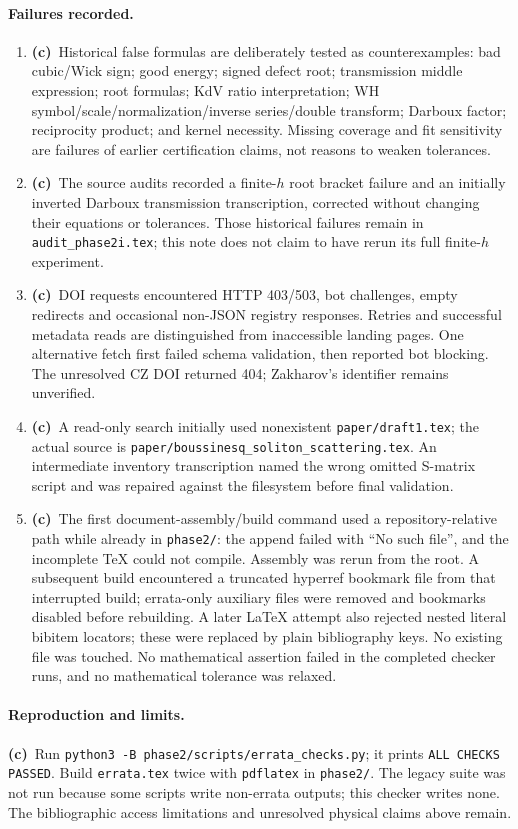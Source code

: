 \documentclass[11pt,a4paper]{article}
\newcommand{\C}{\textbf{(c)}\ }
\newcommand{\file}[1]{\nolinkurl{#1}}
\begin{document}
\paragraph{Failures recorded.}
\begin{enumerate}[leftmargin=*]
\item \C Historical false formulas are deliberately tested as
counterexamples: bad cubic/Wick sign; good energy; signed defect root;
transmission middle expression; root formulas; KdV ratio interpretation;
WH symbol/scale/normalization/inverse series/double transform; Darboux factor;
reciprocity product; and kernel necessity. Missing coverage and fit sensitivity
are failures of earlier certification claims, not reasons to weaken tolerances.
\item \C The source audits recorded a finite-$h$ root bracket failure and
an initially inverted Darboux transmission transcription, corrected without
changing their equations or tolerances. Those historical failures remain in
\file{audit_phase2i.tex}; this note does not claim to have rerun its full
finite-$h$ experiment.
\item \C DOI requests encountered HTTP 403/503, bot challenges, empty
redirects and occasional non-JSON registry responses. Retries and successful
metadata reads are distinguished from inaccessible landing pages. One
alternative fetch first failed schema validation, then reported bot blocking.
The unresolved CZ DOI returned 404; Zakharov's identifier remains unverified.
\item \C A read-only search initially used nonexistent
\file{paper/draft1.tex}; the actual source is
\file{paper/boussinesq_soliton_scattering.tex}. An intermediate inventory
transcription named the wrong omitted S-matrix script and was repaired
against the filesystem before final validation.
\item \C The first document-assembly/build command used a repository-relative
path while already in \file{phase2/}: the append failed with ``No such file'',
and the incomplete TeX could not compile. Assembly was rerun from the root.
A subsequent build encountered a truncated hyperref bookmark file from that
interrupted build; errata-only auxiliary files were removed and bookmarks
disabled before rebuilding. A later LaTeX attempt also rejected nested literal bibitem locators; these
were replaced by plain bibliography keys. No existing file was touched. No mathematical assertion failed in the
completed checker runs, and no mathematical tolerance was relaxed.
\end{enumerate}

\paragraph{Reproduction and limits.}
\C Run \file{python3 -B phase2/scripts/errata_checks.py}; it prints
\texttt{ALL CHECKS PASSED}. Build \file{errata.tex} twice with
\file{pdflatex} in \file{phase2/}. The legacy suite was not run because
some scripts write non-errata outputs; this checker writes none. The
bibliographic access limitations and unresolved physical claims above remain.
\end{document}
